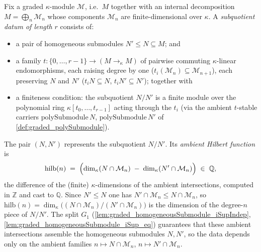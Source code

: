 \begin{definition}\leanok
  \label{def:graded_subquotientHilb}
  Fix a graded \(\kappa\)-module \(\mathcal{M}\), i.e.\ \(M\) together with an
  internal decomposition \(M = \bigoplus_n \mathcal{M}_n\) whose components
  \(\mathcal{M}_n\) are finite-dimensional over \(\kappa\). A \emph{subquotient
  datum of length \(r\)} consists of:
  \begin{itemize}
    \item a pair of homogeneous submodules \(N' \le N \subseteq M\); and
    \item a family \(t : \{0, \dots, r-1\} \to (M \to_\kappa M)\) of pairwise
      commuting \(\kappa\)-linear endomorphisms, each raising degree by one
      (\(t_i(\mathcal{M}_n) \subseteq \mathcal{M}_{n+1}\)), each preserving \(N\)
      and \(N'\) (\(t_i N \subseteq N\), \(t_i N' \subseteq N'\)); together with
    \item a finiteness condition: the subquotient \(N/N'\) is a finite module over the
      polynomial ring \(\kappa[t_0, \dots, t_{r-1}]\) acting through the \(t_i\) (via the
      ambient \(t\)-stable carriers \(\mathrm{polySubmodule}\,N\),
      \(\mathrm{polySubmodule}\,N'\) of \cref{def:graded_polySubmodule}).
  \end{itemize}
  The pair \((N, N')\) represents the subquotient \(N/N'\). Its \emph{ambient
  Hilbert function} is
  \[
    \mathrm{hilb}(n) \;=\; \Bigl(\dim_\kappa (N \cap \mathcal{M}_n)
      \;-\; \dim_\kappa (N' \cap \mathcal{M}_n)\Bigr) \;\in\; \mathbb{Q},
  \]
  the difference of the (finite) \(\kappa\)-dimensions of the ambient intersections,
  computed in \(\mathbb{Z}\) and cast to \(\mathbb{Q}\). Since \(N' \le N\) one has
  \(N' \cap \mathcal{M}_n \le N \cap \mathcal{M}_n\), so
  \(\mathrm{hilb}(n) = \dim_\kappa\bigl((N \cap \mathcal{M}_n)/(N' \cap \mathcal{M}_n)\bigr)\)
  is the dimension of the degree-\(n\) piece of \(N/N'\). The split \(G_1\)
  (\cref{lem:graded_homogeneousSubmodule_iSupIndep},
  \cref{lem:graded_homogeneousSubmodule_iSup_eq}) guarantees that these ambient
  intersections assemble the homogeneous submodules \(N, N'\), so the data depends
  only on the ambient families \(n \mapsto N \cap \mathcal{M}_n\),
  \(n \mapsto N' \cap \mathcal{M}_n\).
\end{definition}

